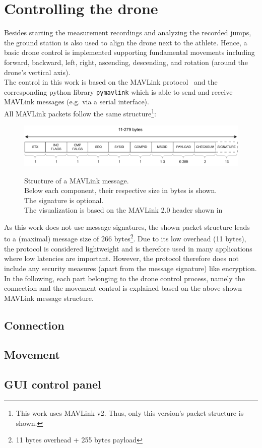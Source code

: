 \section{Controlling the drone}\label{sec:4_drone_ctrl}
Besides starting the measurement recordings and analyzing the recorded jumps,
the ground station is also used to align the drone next to the athlete.
Hence, a basic drone control is implemented supporting fundamental movements
including forward, backward, left, right, ascending, descending, and rotation
(around the drone's vertical axis).\\
The control in this work is based on the MAVLink
protocol~\cite{koubaaMicroAirVehicle2019} and the
corresponding python library \texttt{pymavlink} which is able to send and
receive MAVLink messages (e.g. via a serial interface).\\
All MAVLink packets follow the same structure\footnote{This work uses MAVLink
v2. Thus, only this version's packet structure is shown.}:
\begin{figure}[!h]
    \centering
    \includegraphics[scale=0.7]{mavlink_v2.pdf}
    \label{fig:4_mavlink_message}
    \caption[Structure of a MAVLink message]{Structure of a MAVLink message.\\
    Below each component, their respective size in bytes is shown.\\
    The signature is optional.\\
    The visualization is based on the MAVLink 2.0 header shown
    in~\cite{koubaaMicroAirVehicle2019}}
\end{figure}
As this work does not use message signatures, the shown packet structure leads
to a (maximal) message size of 266 bytes\footnote{11 bytes overhead + 255
bytes payload}.
Due to its low overhead (11 bytes), the protocol is considered lightweight and
is therefore used in many applications where low latencies are important.
However, the protocol therefore does not include any security measures (apart
from the message signature) like encryption.\\
In the following, each part belonging to the drone control process, namely
the connection and the movement control is explained based on the above shown
MAVLink message structure.

\subsection{Connection}\label{subsec:4_drone_conn}
\subsection{Movement}\label{subsec:4_drone_mvmnt}
\subsection{GUI control panel}\label{subsec:4_drone_ctrl_panel_gui}
